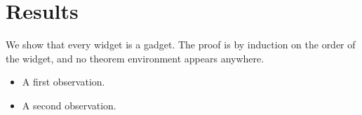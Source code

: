 \documentclass{article}
\begin{document}
\section{Results}

We show that every widget is a gadget. The proof is by induction on the
order of the widget, and no theorem environment appears anywhere.

\begin{itemize}
\item A first observation.
\item A second observation.
\end{itemize}
\end{document}
